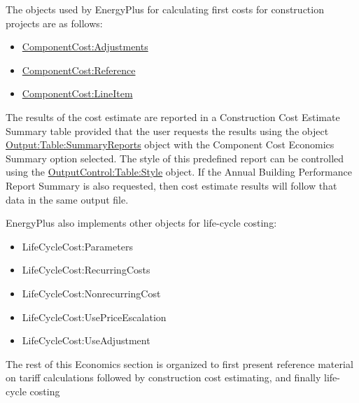 The objects used by EnergyPlus for calculating first costs for construction projects are as follows:

\begin{itemize}
\item
  \hyperref[componentcostadjustments]{ComponentCost:Adjustments}
\item
  \hyperref[componentcostreference]{ComponentCost:Reference}
\item
  \hyperref[componentcostlineitem]{ComponentCost:LineItem}
\end{itemize}

The results of the cost estimate are reported in a Construction Cost Estimate Summary table provided that the user requests the results using the object \hyperref[outputtablesummaryreports]{Output:Table:SummaryReports} object with the Component Cost Economics Summary option selected. The style of this predefined report can be controlled using the \hyperref[outputcontroltablestyle]{OutputControl:Table:Style} object. If the Annual Building Performance Report Summary is also requested, then cost estimate results will follow that data in the same output file.

EnergyPlus also implements other objects for life-cycle costing:

\begin{itemize}
\item
  LifeCycleCost:Parameters
\item
  LifeCycleCost:RecurringCosts
\item
  LifeCycleCost:NonrecurringCost
\item
  LifeCycleCost:UsePriceEscalation
\item
  LifeCycleCost:UseAdjustment
\end{itemize}

The rest of this Economics section is organized to first present reference material on tariff calculations followed by construction cost estimating, and finally life-cycle costing
